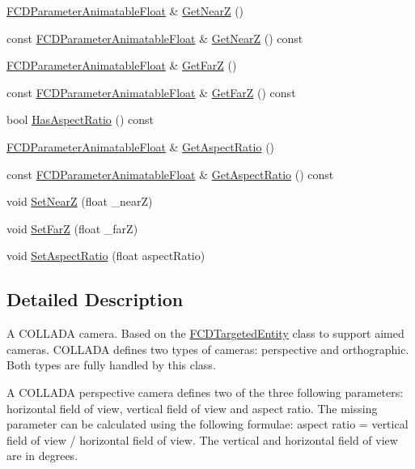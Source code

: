 \begin{DoxyCompactItemize}
\item 
\hyperlink{classFCDParameterAnimatableT}{FCDParameterAnimatableFloat} \& \hyperlink{classFCDCamera_ac4de7173eb7c64fcc14c8bbd8c441b9e}{GetNearZ} ()
\item 
const \hyperlink{classFCDParameterAnimatableT}{FCDParameterAnimatableFloat} \& \hyperlink{classFCDCamera_a636bb27274e22fb19970827eded29dd0}{GetNearZ} () const 
\item 
\hyperlink{classFCDParameterAnimatableT}{FCDParameterAnimatableFloat} \& \hyperlink{classFCDCamera_a54a1ade62890179821725b0a8a158bab}{GetFarZ} ()
\item 
const \hyperlink{classFCDParameterAnimatableT}{FCDParameterAnimatableFloat} \& \hyperlink{classFCDCamera_a2604bcc802d800f035bb1417d71bb8f9}{GetFarZ} () const 
\item 
bool \hyperlink{classFCDCamera_a634c417903dd0f337851756b7f506c70}{HasAspectRatio} () const 
\item 
\hyperlink{classFCDParameterAnimatableT}{FCDParameterAnimatableFloat} \& \hyperlink{classFCDCamera_a16ba395c9fe1d551a80edc8b51e07e0d}{GetAspectRatio} ()
\item 
const \hyperlink{classFCDParameterAnimatableT}{FCDParameterAnimatableFloat} \& \hyperlink{classFCDCamera_a51fd69058b906cc152ac0e42bd08fcf0}{GetAspectRatio} () const 
\item 
void \hyperlink{classFCDCamera_a5897d7a1ba3e10316f0f2f183530ee45}{SetNearZ} (float \_\-nearZ)
\item 
void \hyperlink{classFCDCamera_af833473ab121efed5be5f02d8680d51c}{SetFarZ} (float \_\-farZ)
\item 
void \hyperlink{classFCDCamera_ad36e7b6987ff8a7f1a9145148a49fa5b}{SetAspectRatio} (float aspectRatio)
\end{DoxyCompactItemize}


\subsection{Detailed Description}
A COLLADA camera. Based on the \hyperlink{classFCDTargetedEntity}{FCDTargetedEntity} class to support aimed cameras. COLLADA defines two types of cameras: perspective and orthographic. Both types are fully handled by this class.

A COLLADA perspective camera defines two of the three following parameters: horizontal field of view, vertical field of view and aspect ratio. The missing parameter can be calculated using the following formulae: aspect ratio = vertical field of view / horizontal field of view. The vertical and horizontal field of view are in degrees.

